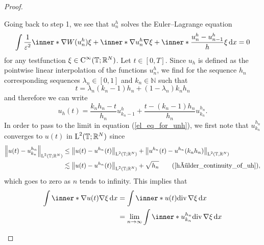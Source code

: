 \begin{proof}
\begin{description}[wide=0pt]
	Going back to step 1, we see that $ u_{ n }^{ h } $ solves the Euler--Lagrange equation
	\begin{equation}
		\label{el_eq_for_unh}
		\int
			\frac{ 1 }{ \varepsilon^{ 2 } }
			\inner*{ \nabla W ( u_{ n }^{ h } ) }  { \xi }
			+
			\inner*{ \nabla u_{ n }^{ h } }{ \nabla \xi }
			+
			\inner*{ \frac{ u_{ n }^{ h } - u_{ n - 1 }^{ h } }{ h } }{ \xi }
		\dd{ x }
		=
		0
	\end{equation}
	for any testfunction $ \xi \in \operatorname{C}^{ \infty } ( \operatorname{\mathbb{T}} ; \mathbb{ R }^{ N } )  $.
	Let $ t \in [ 0 , T ] $. Since $ u_{ h } $ is defined as the pointwise linear interpolation of the functions $ u_{ n}^{ h } $, we find for the sequence $ h_{ n } $ corresponding sequences $ \lambda_{ n } \in [ 0 , 1 ] $ and $ k_{ n } \in \mathbb{ N }$ such that 
	\begin{equation*}
		t = \lambda_{ n } ( k_{ n } - 1 ) h_{ n } + ( 1 - \lambda_{ n } ) k_{ n } h_{ n } 
	\end{equation*}
	and therefore we can write
	\begin{equation*}
		u_{ h } ( t ) 
		=
		\frac{ k_{ n } h_{ n } - t }{ h_{ n } } u_{ k_{ n } - 1 }^{ h }
		+
		\frac{ t - ( k_{ n } - 1 ) h_{ n } }{ h_{ n } }
		u_{ k_{ n } }^{ h_{ n } }.
	\end{equation*}
	In order to pass to the limit in equation (\ref{el_eq_for_unh}), we first note that $ u_{ k_{ n } }^{ h_{ n } } $ converges to $ u ( t ) $ in $ \operatorname{L}^{ 2 } ( \operatorname{\mathbb{T}} ; \mathbb{ R }^{ N } ) $ since
	\begin{align*}
		\norm{ u ( t ) - u_{ k_{ n } }^{ h_{ n } } }_{ \lp^{ 2 } ( \flattorus ; \mathbb{ R }^{ N } ) }
		& \leq
		\norm{ u ( t ) - u^{ h_{ n } } ( t ) }_{ \lp^{ 2 } ( \flattorus ; \mathbb{ R }^{ N } ) }
		+
		\norm{ u^{ h_{ n } } ( t ) - u^{ h_{ n } } ( k_{n } h_{ n } ) }_{ \lp^{ 2 } ( \flattorus, \mathbb{ R }^{ N } ) }
		\\
		& \lesssim
		\norm{ u ( t ) - u^{ h_{ n } } ( t ) }_{ \lp^{ 2 } ( \flattorus ; \mathbb{ R }^{ N } ) }
		+ 
		\sqrt{ h_{ n } }
		\tag{\ref{hölder_continuity_of_uh}},
	\end{align*}
	which goes to zero as $ n $ tends to infinity.
	This implies that 
	\begin{align*}
		\int
			\inner*{ \nabla u ( t ) }{ \nabla \xi }
		\dd{ x }
		& = 
		\int
			\inner*{ u ( t ) }{ \divg \nabla \xi  }
		\dd{ x }
		\\
		& = 
		\lim_{ n \to \infty }
			\int
				\inner*{ u_{ k_{ n } }^{ h_{ n } } }{ \divg \nabla \xi  }
			\dd{x }
		\\

\end{align*}
\end{description}
\end{proof}
